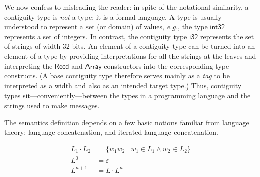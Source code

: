 \documentclass[svgnames]{llncs}
\newcommand{\eg}{\textit{e.g.}}
\newcommand{\konst}[1]{\ensuremath{\mathsf{#1}}}
\newcommand{\set}[1]{\ensuremath{\{ {#1} \}}}
\begin{document}
 We now confess to misleading the reader: in spite of the notational
 similarity, a contiguity type is \emph{not} a type: it is a formal
 language. A type is usually understood to represent a set (or domain)
 of values, \eg, the type \konst{int32} represents a set of
 integers. In contrast, the contiguity type \konst{i32} represents the
 set of strings of width 32 bits. An element of a contiguity type can
 be turned into an element of a type by providing interpretations for
 all the strings at the leaves and interpreting the \konst{Recd} and
 \konst{Array} constructors into the corresponding type constructs. (A
 base contiguity type therefore serves mainly as a \emph{tag} to be
 interpreted as a width and also as an intended target type.) Thus,
 contiguity types sit---conveniently---between the types in a
 programming language and the strings used to make messages.

The semantics definition depends on a few basic notions familiar from
language theory: language concatenation, and iterated language
concatenation.

\begin{align*}
L_1 \cdot L_2 &= \set{w_1 w_2 \mid w_1 \in L_1 \land w_2 \in  L_2} \\
L^0 &= \varepsilon \\
L^{n+1} &= L \cdot L^n
\end{align*}
\end{document}
